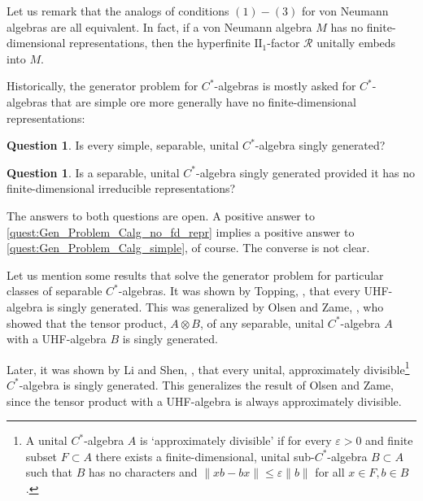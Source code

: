 \documentclass{amsart}
\theoremstyle{definition}
\newtheorem{quest}[questCt]{Question}
\begin{document}
    Let us remark that the analogs of conditions $(1)-(3)$ for von Neumann algebras are all equivalent.
    In fact, if a von Neumann algebra $M$ has no finite-dimensional representations, then the hyperfinite $\text{II}_1$-factor $\mathcal{R}$ unitally embeds into $M$.

    Historically, the generator problem for {{$C^*$-al\-ge\-bra}}{s} is mostly asked for {{$C^*$-al\-ge\-bra}}{s} that are simple ore more generally have no finite-dimensional representations:

\begin{quest}
\label{quest:Gen_Problem_Calg_simple}
        Is every simple, separable, unital {{$C^*$-al\-ge\-bra}}{} singly generated?
\end{quest}

\begin{quest}
\label{quest:Gen_Problem_Calg_no_fd_repr}
        Is a separable, unital {{$C^*$-al\-ge\-bra}}{} singly generated provided it has no finite-dimensional irreducible representations?
\end{quest}

    The answers to both questions are open.
    A positive answer to \autoref{quest:Gen_Problem_Calg_no_fd_repr} implies a positive answer to \autoref{quest:Gen_Problem_Calg_simple}, of course.
    The converse is not clear.

    Let us mention some results that solve the generator problem for particular classes of separable {{$C^*$-al\-ge\-bra}}{s}.
    It was shown by Topping, \cite{Top1968}, that  every UHF-algebra is singly generated.
    This was generalized by Olsen and Zame, \cite[Theorem 9]{OlsZam1976}, who showed that the tensor product, $A\otimes B$, of any separable, unital {{$C^*$-al\-ge\-bra}}{} $A$ with a UHF-algebra $B$ is singly generated.

    Later, it was shown by Li and Shen, \cite[Theorem 3.1]{LiShe2008}, that every unital, approximately
divisible\footnote{A unital {{$C^*$-al\-ge\-bra}}{} $A$ is `approximately divisible' if for every ${\varepsilon}>0$ and finite subset $F\subset A$ there exists a finite-dimensional, unital sub-{{$C^*$-al\-ge\-bra}}{} $B\subset A$ such that $B$ has no characters and $\|xb-bx\|\leq{\varepsilon}\|b\|$ for all $x\in F, b\in B$.}
    {{$C^*$-al\-ge\-bra}}{} is singly generated.
    This generalizes the result of Olsen and Zame, since the tensor product with a UHF-algebra is always approximately divisible.
\end{document}
